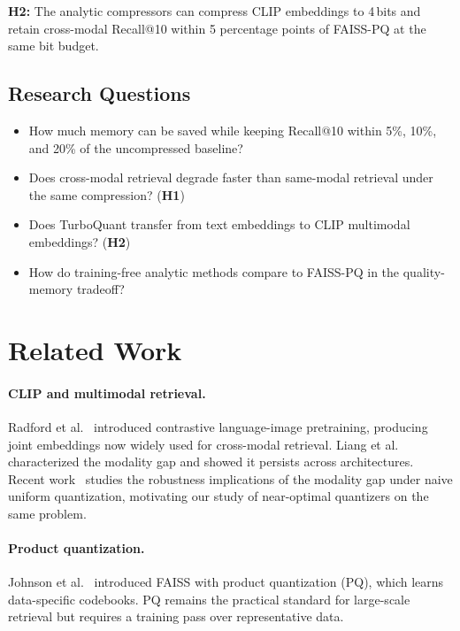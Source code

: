 \documentclass[11pt]{article}
\begin{document}
\textbf{H2:} The analytic compressors can compress CLIP embeddings to 4\,bits and retain
cross-modal Recall@10 within 5 percentage points of FAISS-PQ at the same bit budget.

\subsection*{Research Questions}
\begin{itemize}[leftmargin=*, itemsep=0pt]
  \item How much memory can be saved while keeping Recall@10 within 5\%, 10\%, and 20\% of the uncompressed baseline?
  \item Does cross-modal retrieval degrade faster than same-modal retrieval under the same compression? (\textbf{H1})
  \item Does TurboQuant transfer from text embeddings to CLIP multimodal embeddings? (\textbf{H2})
  \item How do training-free analytic methods compare to FAISS-PQ in the quality-memory tradeoff?
\end{itemize}

\section{Related Work}

\paragraph{CLIP and multimodal retrieval.}
Radford et al.~\cite{radford2021clip} introduced contrastive language-image pretraining, producing joint
embeddings now widely used for cross-modal retrieval. Liang et al.~\cite{liang2022gap} characterized the
modality gap and showed it persists across architectures. Recent work~\cite{yaras2026gap} studies the
robustness implications of the modality gap under naive uniform quantization, motivating our study of
near-optimal quantizers on the same problem.

\paragraph{Product quantization.}
Johnson et al.~\cite{johnson2019faiss} introduced FAISS with product quantization (PQ), which learns
data-specific codebooks. PQ remains the practical standard for large-scale retrieval but requires a
training pass over representative data.
\end{document}

